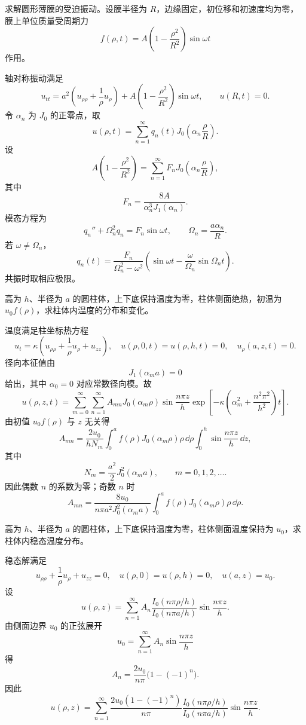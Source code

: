 ﻿


\begin{question}
求解圆形薄膜的受迫振动。设膜半径为 \(R\)，边缘固定，初位移和初速度均为零，膜上单位质量受周期力
\[
f(\rho,t)=A\left(1-\frac{\rho^2}{R^2}\right)\sin\omega t
\]
作用。
\begin{solution}
轴对称振动满足
\[
u_{tt}=a^2\left(u_{\rho\rho}+\frac1\rho u_\rho\right)+
A\left(1-\frac{\rho^2}{R^2}\right)\sin\omega t,\qquad u(R,t)=0.
\]
令 \(\alpha_n\) 为 \(J_0\) 的正零点，取
\[
u(\rho,t)=\sum_{n=1}^{\infty}q_n(t)J_0\left(\alpha_n\frac{\rho}{R}\right).
\]
设
\[
A\left(1-\frac{\rho^2}{R^2}\right)=\sum_{n=1}^{\infty}F_nJ_0\left(\alpha_n\frac{\rho}{R}\right),
\]
其中
\[
F_n=\frac{8A}{\alpha_n^3J_1(\alpha_n)}.
\]
模态方程为
\[
q_n''+\Omega_n^2q_n=F_n\sin\omega t,\qquad
\Omega_n=\frac{a\alpha_n}{R}.
\]
若 \(\omega\ne\Omega_n\)，
\[
q_n(t)=\frac{F_n}{\Omega_n^2-\omega^2}
\left(\sin\omega t-\frac{\omega}{\Omega_n}\sin\Omega_nt\right).
\]
共振时取相应极限。
\end{solution}
\end{question}

\begin{question}
高为 \(h\)、半径为 \(a\) 的圆柱体，上下底保持温度为零，柱体侧面绝热，初温为 \(u_0f(\rho)\)，求柱体内温度的分布和变化。
\begin{solution}
温度满足柱坐标热方程
\[
u_t=\kappa\left(u_{\rho\rho}+\frac1\rho u_\rho+u_{zz}\right),
\quad u(\rho,0,t)=u(\rho,h,t)=0,\quad u_\rho(a,z,t)=0.
\]
径向本征值由
\[
J_1(\alpha_m a)=0
\]
给出，其中 \(\alpha_0=0\) 对应常数径向模。故
\[
u(\rho,z,t)=\sum_{m=0}^{\infty}\sum_{n=1}^{\infty}
A_{mn}J_0(\alpha_m\rho)\sin\frac{n\pi z}{h}
\exp\left[-\kappa\left(\alpha_m^2+\frac{n^2\pi^2}{h^2}\right)t\right].
\]
由初值 \(u_0f(\rho)\) 与 \(z\) 无关得
\[
A_{mn}=\frac{2u_0}{hN_m}\int_0^a f(\rho)J_0(\alpha_m\rho)\rho\,\dd{\rho}
\int_0^h\sin\frac{n\pi z}{h}\,\dd{z},
\]
其中
\[
N_m=\frac{a^2}{2}J_0^2(\alpha_ma),\qquad m=0,1,2,\ldots .
\]
因此偶数 \(n\) 的系数为零；奇数 \(n\) 时
\[
A_{mn}=\frac{8u_0}{n\pi a^2J_0^2(\alpha_ma)}
\int_0^a f(\rho)J_0(\alpha_m\rho)\rho\,\dd{\rho} .
\]
\end{solution}
\end{question}

\begin{question}
高为 \(h\)、半径为 \(a\) 的圆柱体，上下底保持温度为零，柱体侧面温度保持为 \(u_0\)，求柱体内稳态温度分布。
\begin{solution}
稳态解满足
\[
u_{\rho\rho}+\frac1\rho u_\rho+u_{zz}=0,\quad
u(\rho,0)=u(\rho,h)=0,\quad u(a,z)=u_0.
\]
设
\[
u(\rho,z)=\sum_{n=1}^{\infty}A_n
\frac{I_0(n\pi\rho/h)}{I_0(n\pi a/h)}
\sin\frac{n\pi z}{h}.
\]
由侧面边界 \(u_0\) 的正弦展开
\[
u_0=\sum_{n=1}^{\infty}A_n\sin\frac{n\pi z}{h}
\]
得
\[
A_n=\frac{2u_0}{n\pi}\bigl(1-(-1)^n\bigr).
\]
因此
\[
u(\rho,z)=\sum_{n=1}^{\infty}
\frac{2u_0(1-(-1)^n)}{n\pi}
\frac{I_0(n\pi\rho/h)}{I_0(n\pi a/h)}
\sin\frac{n\pi z}{h}.
\]
\end{solution}
\end{question}

